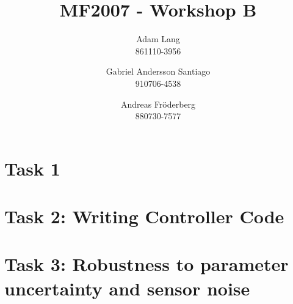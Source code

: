 \documentclass[12pt,a4paper]{article}
\title{MF2007 - Workshop B}
\author{
Adam Lang \\ 861110-3956
\and
Gabriel Andersson Santiago \\ 910706-4538
\and 
Andreas Fr\"oderberg \\ 880730-7577
}
\begin{document}
\maketitle
\section*{Task 1}
  
\section*{Task 2: Writing Controller Code}
  
\section*{Task 3: Robustness to parameter uncertainty and sensor noise}
  
\end{document}
